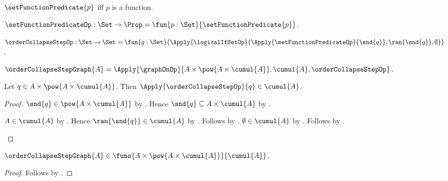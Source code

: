 \begin{definition}\label{set_function_predicate}
    $\setFunctionPredicate{p}$ iff $p$ is a function.
\end{definition}

\begin{definition}\label{set_function_predicate_op}
    $\setFunctionPredicateOp:\Set\to\Prop
        =\fun{p:\Set}{\setFunctionPredicate{p}}$.
\end{definition}

\begin{definition}\label{order_collapse_step_op}
    $\orderCollapseStepOp:\Set\to\Set
        =\fun{q:\Set}{
            \Apply{\logicalIfSetOp}
                {\Apply{\setFunctionPredicateOp}{\snd{q}},\ran{\snd{q}},\emptyset}}$.
\end{definition}

\begin{definition}\label{order_collapse_step_graph}
    $\orderCollapseStepGraph{A}=
        \Apply{\graphOnOp}
            {A\times\pow{A\times\cumul{A}},\cumul{A},\orderCollapseStepOp}$.
\end{definition}

\begin{proposition}\label{order_collapse_step_value_type}
    Let $q\in A\times\pow{A\times\cumul{A}}$.
    Then $\Apply{\orderCollapseStepOp}{q}\in\cumul{A}$.
\end{proposition}
\begin{proof}
    $\snd{q}\in\pow{A\times\cumul{A}}$
        by .
    Hence $\snd{q}\subseteq A\times\cumul{A}$
        by .
    \begin{byCase}
            $A\in\cumul{A}$ by .
            Hence $\ran{\snd{q}}\in\cumul{A}$
                by .
            Follows by
                .
            $\emptyset\in\cumul{A}$
                by .
            Follows by
                .
    \end{byCase}
\end{proof}

\begin{proposition}\label{order_collapse_step_graph_type}
    $\orderCollapseStepGraph{A}
        \in\funs{A\times\pow{A\times\cumul{A}}}{\cumul{A}}$.
\end{proposition}
\begin{proof}
    Follows by
        .
\end{proof}

